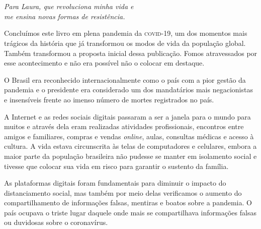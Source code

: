 \chapter*{}
\thispagestyle{empty}
\vfill{}
\begin{flushright}
\textit{Para Laura, que revoluciona minha vida e\\me ensina novas formas de resistência.}
\end{flushright}


\setlength{\epigraphwidth}{.60\textwidth}
\begin{epigraphs}
\end{epigraphs}

\noindent{}Concluímos este livro em plena pandemia da \textsc{covid-19}, um dos momentos
mais trágicos da história que já transformou os modos de vida da
população global. Também transformou a proposta inicial dessa
publicação. Fomos atravessados por esse acontecimento e não era possível
não o colocar em destaque.

O Brasil era reconhecido internacionalmente como o país com a pior
gestão da pandemia e o presidente era considerado um dos mandatários
mais negacionistas e insensíveis frente ao imenso número de mortes
registrados no país.

A Internet e as redes sociais digitais passaram a ser a janela para o
mundo para muitos e através dela eram realizadas atividades
profissionais, encontros entre amigos e familiares, compras e vendas
\textit{online}, aulas, consultas médicas e acesso à cultura. A vida
estava circunscrita às telas de computadores e celulares, embora
a maior parte da população brasileira não pudesse se manter em
isolamento social e tivesse que colocar sua vida em risco para garantir
o sustento da família.

As plataformas digitais foram fundamentais para diminuir o impacto do
distanciamento social, mas também por meio delas verificamos o aumento
do compartilhamento de informações falsas, mentiras e boatos sobre a
pandemia. O país ocupava o triste lugar daquele onde mais se compartilhava
informações falsas ou duvidosas sobre o coronavírus.

